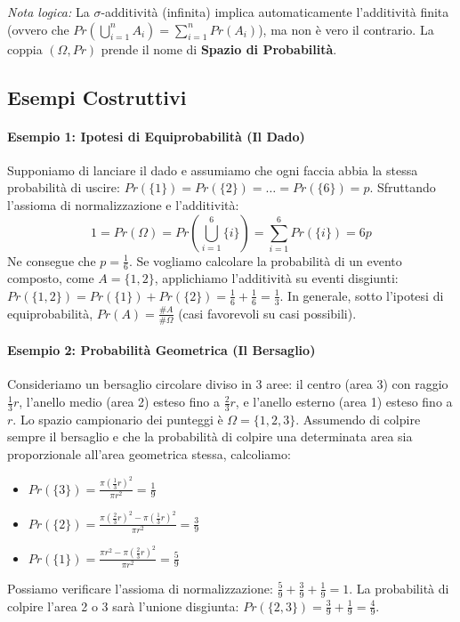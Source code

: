 \documentclass[12pt, a4paper]{article}
\begin{document}
\textit{Nota logica:} La $\sigma$-additività (infinita) implica automaticamente l'additività finita (ovvero che $Pr(\bigcup_{i=1}^n A_i) = \sum_{i=1}^n Pr(A_i)$), ma non è vero il contrario.
La coppia $(\Omega, Pr)$ prende il nome di \textbf{Spazio di Probabilità}.

\subsection{Esempi Costruttivi}

\paragraph{Esempio 1: Ipotesi di Equiprobabilità (Il Dado)}
Supponiamo di lanciare il dado e assumiamo che ogni faccia abbia la stessa probabilità di uscire: $Pr(\{1\}) = Pr(\{2\}) = \dots = Pr(\{6\}) = p$.
Sfruttando l'assioma di normalizzazione e l'additività:
$$ 1 = Pr(\Omega) = Pr\left(\bigcup_{i=1}^6 \{i\}\right) = \sum_{i=1}^6 Pr(\{i\}) = 6p $$ 
Ne consegue che $p = \frac{1}{6}$. 
Se vogliamo calcolare la probabilità di un evento composto, come $A = \{1, 2\}$, applichiamo l'additività su eventi disgiunti: $Pr(\{1,2\}) = Pr(\{1\}) + Pr(\{2\}) = \frac{1}{6} + \frac{1}{6} = \frac{1}{3}$.
In generale, sotto l'ipotesi di equiprobabilità, $Pr(A) = \frac{\#A}{\#\Omega}$ (casi favorevoli su casi possibili).

\paragraph{Esempio 2: Probabilità Geometrica (Il Bersaglio)}
Consideriamo un bersaglio circolare diviso in 3 aree: il centro (area 3) con raggio $\frac{1}{3}r$, l'anello medio (area 2) esteso fino a $\frac{2}{3}r$, e l'anello esterno (area 1) esteso fino a $r$. Lo spazio campionario dei punteggi è $\Omega = \{1, 2, 3\}$.
Assumendo di colpire sempre il bersaglio e che la probabilità di colpire una determinata area sia proporzionale all'area geometrica stessa, calcoliamo:
\begin{itemize}
    \item $Pr(\{3\}) = \frac{\pi (\frac{1}{3}r)^2}{\pi r^2} = \frac{1}{9}$ 
    \item $Pr(\{2\}) = \frac{\pi (\frac{2}{3}r)^2 - \pi (\frac{1}{3}r)^2}{\pi r^2} = \frac{3}{9}$ 
    \item $Pr(\{1\}) = \frac{\pi r^2 - \pi (\frac{2}{3}r)^2}{\pi r^2} = \frac{5}{9}$ 
\end{itemize}
Possiamo verificare l'assioma di normalizzazione: $\frac{5}{9} + \frac{3}{9} + \frac{1}{9} = 1$. La probabilità di colpire l'area 2 o 3 sarà l'unione disgiunta: $Pr(\{2,3\}) = \frac{3}{9} + \frac{1}{9} = \frac{4}{9}$.
\end{document}
